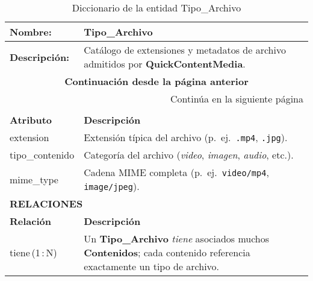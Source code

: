 \renewcommand{\arraystretch}{1.3}
\begin{longtable}{|p{3.5cm}|p{10cm}|}
\caption{Diccionario de la entidad Tipo\_Archivo}
\label{tab:diccionarioTipoArchivo} \\ 
\hline
\textbf{Nombre:} & Tipo\_Archivo \\
\hline
\textbf{Descripción:} & 
Catálogo de extensiones y metadatos de archivo admitidos por
\textbf{QuickContentMedia}. \\ \hline
\endfirsthead

\multicolumn{2}{c}{\textbf{Continuación desde la página anterior}} \\ 
\endhead

\hline \multicolumn{2}{r}{{Continúa en la siguiente página}} \\ 
\endfoot

\hline
\endlastfoot

\multicolumn{2}{|p{13.5cm}|}{\textbf{ATRIBUTOS}} \\ \hline
\textbf{Atributo} & \textbf{Descripción} \\ \hline
extension         & Extensión típica del archivo (p.~ej.\ \texttt{.mp4}, \texttt{.jpg}). \\ \hline
tipo\_contenido   & Categoría del archivo (\textit{video}, \textit{imagen}, \textit{audio}, etc.). \\ \hline
mime\_type        & Cadena MIME completa (p.~ej.\ \texttt{video/mp4}, \texttt{image/jpeg}). \\ \hline

\multicolumn{2}{|p{13.5cm}|}{\textbf{RELACIONES}} \\ \hline
\textbf{Relación} & \textbf{Descripción} \\ \hline
tiene\,(1\,:\,N) & Un \textbf{Tipo\_Archivo} \textit{tiene} asociados muchos \textbf{Contenidos}; cada contenido referencia exactamente un tipo de archivo. \\ \hline
\end{longtable}